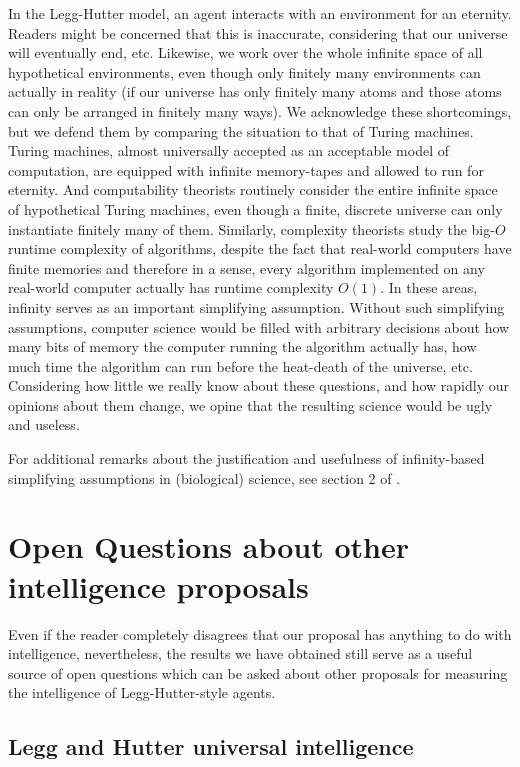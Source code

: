\documentclass[twoside,11pt]{article}
\begin{document}
In the Legg-Hutter model, an agent interacts with an environment for an eternity.
Readers might be concerned that this is inaccurate, considering that our universe
will eventually end, etc. Likewise, we work over the whole infinite space of
all hypothetical environments, even though only finitely many environments can
actually in reality (if our universe has only finitely many atoms and those
atoms can only be arranged in finitely many ways). We acknowledge these shortcomings,
but we defend them by comparing the situation to that of Turing machines. Turing
machines, almost universally accepted as an acceptable model of computation, are
equipped with infinite memory-tapes and allowed to run for eternity. And
computability theorists routinely consider the entire infinite space of hypothetical
Turing machines, even though a finite, discrete universe can only
instantiate finitely many of them. Similarly, complexity theorists study
the big-$O$ runtime complexity of algorithms, despite the fact that real-world
computers have finite memories and therefore in a sense, every algorithm implemented
on any real-world computer actually has runtime complexity $O(1)$. In these areas,
infinity serves as an important simplifying assumption. Without such simplifying
assumptions, computer science would be filled with arbitrary decisions about
how many bits of memory the computer running the algorithm actually has, how much
time the algorithm can run before the heat-death of the universe, etc. Considering
how little we really know about these questions, and how rapidly our opinions about
them change, we opine that the resulting science would be ugly and useless.

For additional remarks about the justification and usefulness of infinity-based
simplifying assumptions in (biological) science, see section 2 of
\cite{alexander2013}.

\section{Open Questions about other intelligence proposals}

Even if the reader completely disagrees that our proposal has anything to do with
intelligence, nevertheless, the results we have obtained still serve as
a useful source of open questions which can be asked about other proposals for
measuring the intelligence of Legg-Hutter-style agents.

\subsection{Legg and Hutter universal intelligence}
\end{document}
